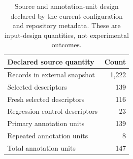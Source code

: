 \begin{table}[t]
  \centering
  \small
  \begin{tabular}{@{}lr@{}}
    \toprule
    Declared source quantity & Count \\
    \midrule
    Records in external snapshot & 1,222 \\
    Selected descriptors & 139 \\
    Fresh selected descriptors & 116 \\
    Regression-control descriptors & 23 \\
    Primary annotation units & 139 \\
    Repeated annotation units & 8 \\
    Total annotation units & 147 \\
    \bottomrule
  \end{tabular}
  \caption{Source and annotation-unit design declared by the current
  configuration and repository metadata.  These are input-design quantities,
  not experimental outcomes.}
  \label{tab:sample-design}
\end{table}
